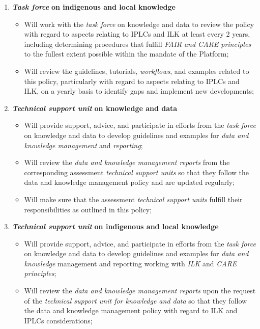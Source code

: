 \documentclass{article}
\begin{document}
\begin{enumerate}[label=(\alph*)]
    \item \textit{\textbf{Task force}}\textbf{ on indigenous and local knowledge}
    \begin{itemize}
        \item Will work with the \textit{task force} on knowledge and data to review the policy with regard to aspects relating to IPLCs and ILK at least every 2 years, including determining procedures that fulfill \textit{FAIR and CARE principles} to the fullest extent possible within the mandate of the Platform;
        \item Will review the guidelines, tutorials, \textit{workflows}, and examples related to this policy, particularly with regard to aspects relating to IPLCs and ILK, on a yearly basis to identify gaps and implement new developments;
    \end{itemize}

    \item \textit{\textbf{Technical support unit}}\textbf{ on knowledge and data}
    \begin{itemize}
        \item Will provide support, advice, and participate in efforts from the \textit{task force} on knowledge and data to develop guidelines and examples for \textit{data and knowledge management} and \textit{reporting};
        \item Will review the \textit{data and knowledge management reports} from the corresponding assessment \textit{technical support units} so that they follow the data and knowledge management policy and are updated regularly;
        \item Will make sure that the assessment \textit{technical support units} fulfill their responsibilities as outlined in this policy;
    \end{itemize}

    \item \textit{\textbf{Technical support unit}}\textbf{ on indigenous and local knowledge}
    \begin{itemize}
        \item Will provide support, advice, and participate in efforts from the \textit{task force} on knowledge and data to develop guidelines and examples for \textit{data and knowledge} management and reporting working with \textit{ILK} and \textit{CARE principles}; 
        \item Will review the \textit{data and knowledge management reports} upon the request of the \textit{technical support unit for knowledge and data} so that they follow the data and knowledge management policy with regard to ILK and IPLCs considerations;
    \end{itemize}


\end{enumerate}
\end{document}
